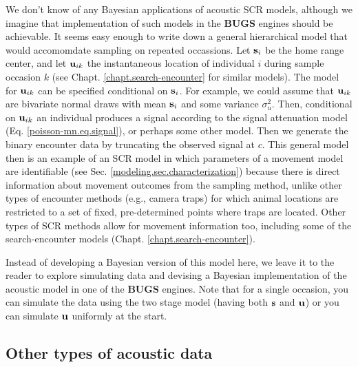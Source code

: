 We don't know of any Bayesian applications of acoustic SCR models,
although we imagine that implementation of such models in the {\bf
  BUGS} engines should be achievable.  It seems easy enough to write
down a general hierarchical model that would accomomdate sampling on
repeated occassions. Let ${\bf s}_{i}$ be the home range center, and
let ${\bf u}_{ik}$ the instantaneous location of individual $i$ during
sample occasion $k$ (see Chapt. \ref{chapt.search-encounter} for
similar models). The model for ${\bf u}_{ik}$ can be specified
conditional on ${\bf s}_{i}$. For example, we could assume that ${\bf
  u}_{ik}$ are bivariate normal draws with mean ${\bf s}_{i}$ and some
variance $\sigma_{u}^{2}$. Then, conditional on ${\bf u}_{ik}$ an
individual produces a signal according to the signal attenuation model
(Eq. \ref{poisson-mn.eq.signal}), or perhaps some other model. Then we
generate the binary encounter data by truncating the observed signal
at $c$. This general model then is an example of an SCR model in which
parameters of a movement model are identifiable 
(see Sec. \ref{modeling.sec.characterization})
 because
there is direct information about movement outcomes from the sampling
method, unlike other types of encounter methods (e.g., camera traps)
for which animal locations are restricted to a set of fixed, pre-determined
points where traps are located.  Other types of SCR methods allow for
movement information too, including some of the search-encounter
models (Chapt. \ref{chapt.search-encounter}).


Instead of developing a Bayesian version of this model here,
we leave it to the reader to
explore simulating data and devising a Bayesian implementation of the
acoustic model in one of the {\bf BUGS} engines.  Note that for a
single occasion, you can simulate the data using the two stage model
(having both ${\bf s}$ and ${\bf u}$) or you can simulate ${\bf u}$
uniformly at the start.




\subsection{Other types of acoustic data}

